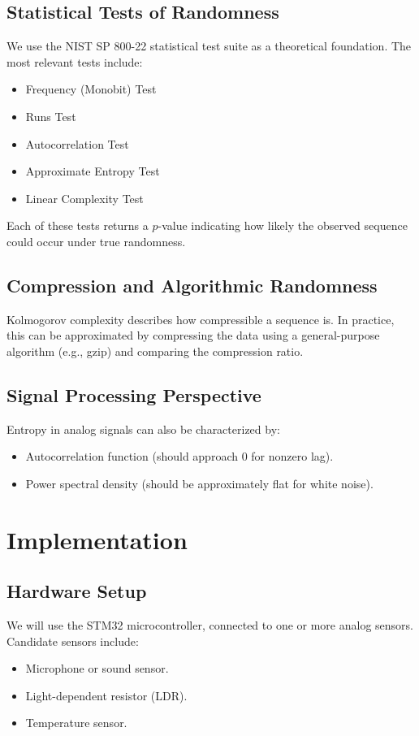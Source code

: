 \subsection{Statistical Tests of Randomness}
We use the NIST SP 800-22 statistical test suite as a theoretical 
foundation. The most relevant tests include:
\begin{itemize}
    \item Frequency (Monobit) Test
    \item Runs Test
    \item Autocorrelation Test
    \item Approximate Entropy Test
    \item Linear Complexity Test
\end{itemize}
Each of these tests returns a $p$-value indicating how likely the 
observed sequence could occur under true randomness.

\subsection{Compression and Algorithmic Randomness}
Kolmogorov complexity describes how compressible a sequence is. 
In practice, this can be approximated by compressing the data using 
a general-purpose algorithm (e.g., gzip) and comparing the compression ratio.

\subsection{Signal Processing Perspective}
Entropy in analog signals can also be characterized by:
\begin{itemize}
    \item Autocorrelation function (should approach 0 for nonzero lag).
    \item Power spectral density (should be approximately flat for white noise).
\end{itemize}

\newpage
\section{Implementation}
\subsection{Hardware Setup}
We will use the STM32 microcontroller, connected to one or more analog 
sensors. Candidate sensors include:
\begin{itemize}
    \item Microphone or sound sensor.
    \item Light-dependent resistor (LDR).
    \item Temperature sensor.
\end{itemize}


